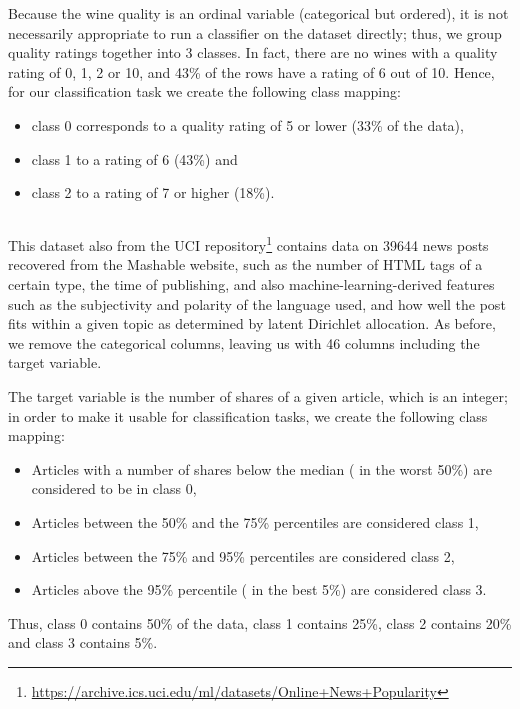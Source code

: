 \documentclass[../main.tex]{subfiles}
\begin{document}
Because the wine quality is an ordinal variable (categorical but ordered), it is not necessarily appropriate to run a classifier on the dataset directly;
thus, we group quality ratings together into 3 classes.
In fact, there are no wines with a quality rating of 0, 1, 2 or 10, and 43\% of the rows have a rating of 6 out of 10.
Hence, for our classification task we create the following class mapping:
\begin{itemize}
    \item class 0 corresponds to a quality rating of 5 or lower (33\% of the data),
    \item class 1 to a rating of 6 (43\%) and
    \item class 2 to a rating of 7 or higher (18\%).
\end{itemize}

\subsection{\OnlineNewsPopularity}

This dataset \cite{fernandesProactive2015} also from the UCI repository\footnote{\url{https://archive.ics.uci.edu/ml/datasets/Online+News+Popularity}} contains data on 39644 news posts recovered from the Mashable website, such as the number of HTML tags of a certain type, the time of publishing, and also machine-learning-derived features such as the subjectivity and polarity of the language used, and how well the post fits within a given topic as determined by latent Dirichlet allocation.
As before, we remove the categorical columns, leaving us with 46 columns including the target variable.

The target variable is the number of shares of a given article, which is an integer; in order to make it usable for classification tasks, we create the following class mapping:
\begin{itemize}
    \item Articles with a number of shares below the median (\ie{} in the worst 50\%) are considered to be in class 0,
    \item Articles between the 50\% and the 75\% percentiles are considered class 1,
    \item Articles between the 75\% and 95\% percentiles are considered class 2,
\item Articles above the 95\% percentile (\ie{} in the best 5\%) are considered class 3.
\end{itemize}
Thus, class 0 contains 50\% of the data, class 1 contains 25\%, class 2 contains 20\% and class 3 contains 5\%.
\end{document}
